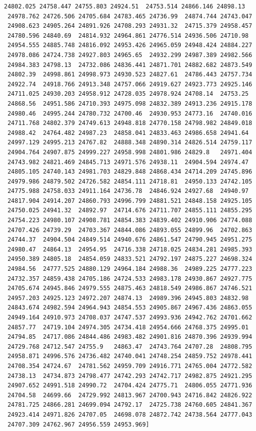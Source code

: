 \documentclass[11pt]{article}
\begin{document}
\begin{Verbatim}[commandchars=\\\{\}]
 24802.025 24758.447 24755.803 24924.51  24753.514 24866.146 24898.13
 24978.762 24726.506 24705.684 24783.465 24736.99  24874.744 24743.047
 24908.623 24905.264 24891.926 24708.293 24931.32  24715.379 24958.457
 24780.596 24840.69  24814.932 24964.861 24776.514 24936.506 24710.98
 24954.555 24885.748 24816.092 24953.426 24965.059 24948.424 24884.227
 24978.086 24724.738 24927.803 24965.65  24932.299 24987.389 24982.566
 24984.383 24798.13  24732.086 24836.441 24871.701 24882.682 24873.549
 24802.39  24998.861 24998.973 24930.523 24827.61  24786.443 24757.734
 24922.74  24918.766 24913.348 24757.066 24919.627 24923.773 24925.146
 24711.025 24930.203 24958.912 24728.035 24978.924 24708.14  24753.25
 24868.56  24951.586 24710.393 24975.098 24832.389 24913.236 24915.178
 24980.46  24995.244 24780.732 24700.46  24930.953 24773.16  24740.016
 24711.768 24802.379 24749.613 24948.818 24770.158 24798.982 24849.018
 24988.42  24764.482 24987.23  24858.041 24833.463 24986.658 24941.64
 24997.129 24995.213 24767.82  24888.348 24890.314 24826.514 24759.117
 24904.764 24907.875 24999.227 24958.998 24801.986 24829.8   24971.404
 24743.982 24821.469 24845.713 24971.576 24938.11  24904.594 24974.47
 24805.105 24740.143 24981.703 24829.848 24868.434 24714.209 24745.896
 24979.986 24879.502 24726.582 24854.111 24718.81  24950.133 24742.105
 24775.988 24758.033 24911.164 24736.78  24846.924 24927.68  24940.97
 24817.904 24914.207 24860.793 24996.799 24881.521 24848.158 24925.105
 24750.025 24941.32  24892.97  24714.676 24711.707 24855.111 24855.295
 24754.223 24980.107 24908.781 24854.383 24839.402 24910.906 24774.088
 24707.426 24739.29  24703.367 24844.086 24893.055 24899.96  24702.863
 24744.37  24904.504 24849.514 24940.676 24861.547 24790.945 24951.275
 24980.47  24864.13  24954.95  24716.338 24718.025 24834.281 24985.393
 24950.389 24805.18  24854.059 24833.521 24792.197 24875.227 24698.324
 24984.56  24777.525 24880.129 24964.184 24988.36  24989.225 24777.223
 24732.357 24859.438 24705.186 24724.533 24983.178 24930.867 24927.775
 24705.674 24945.846 24979.555 24875.463 24818.549 24986.867 24746.521
 24957.203 24925.123 24972.207 24874.13  24989.396 24945.803 24832.98
 24843.674 24982.594 24964.943 24854.553 24905.867 24967.436 24863.055
 24949.164 24910.973 24708.037 24747.537 24993.936 24942.762 24701.662
 24857.77  24719.104 24974.305 24734.418 24954.666 24768.375 24995.01
 24794.85  24717.086 24844.486 24983.482 24901.816 24870.396 24939.994
 24729.768 24712.547 24755.9   24863.47  24743.764 24707.28  24808.795
 24958.871 24996.576 24736.482 24740.041 24748.254 24859.752 24978.441
 24708.354 24724.67  24781.562 24959.709 24916.771 24765.004 24772.582
 24738.13  24734.873 24798.477 24742.293 24742.717 24982.875 24921.295
 24907.652 24991.518 24990.72  24704.424 24775.71  24806.055 24771.936
 24704.58  24699.66  24729.992 24813.967 24700.943 24716.842 24826.922
 24781.725 24866.281 24699.094 24792.17  24725.738 24760.605 24841.367
 24923.414 24971.826 24707.05  24698.078 24872.742 24738.564 24777.043
 24707.309 24762.967 24956.559 24953.969]


\end{Verbatim}
\end{document}
